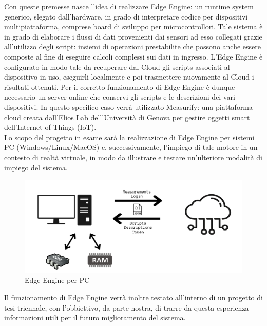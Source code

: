 Con queste premesse nasce l'idea di realizzare Edge Engine: un runtime system generico, slegato dall'hardware, in grado di interpretare codice per dispositivi multipiattaforma, comprese board di sviluppo per microcontrollori. Tale sistema è in grado di elaborare i flussi di dati provenienti dai sensori ad esso collegati grazie all'utilizzo degli script: insiemi di operazioni prestabilite che possono anche essere composte al fine di eseguire calcoli complessi sui dati in ingresso. L'Edge Engine è configurato in modo tale da recuperare dal Cloud gli scripts associati al dispositivo in uso, eseguirli localmente e poi trasmettere nuovamente al Cloud i risultati ottenuti. Per il corretto funzionamento di Edge Engine è dunque necessario un server online che conservi gli scripts e le descrizioni dei vari dispositivi. In questo specifico caso verrà utilizzato Measurify: una piattaforma cloud creata dall'Elios Lab dell'Università di Genova per gestire oggetti smart dell'Internet of Things (IoT).\\
Lo scopo del progetto in esame sarà la realizzazione di Edge Engine per sistemi PC (Windows/Linux/MacOS) e, successivamente, l'impiego di tale motore in un contesto di realtà virtuale, in modo da illustrare e testare un'ulteriore modalità di impiego del sistema.
\begin{figure}[H]
	\centering
	\includegraphics[width=\linewidth]{pics/edgine}
	\caption{Edge Engine per PC}
	\label{edgine}
\end{figure}
Il funzionamento di Edge Engine verrà inoltre testato all'interno di un progetto di tesi triennale, con l'obbiettivo, da parte nostra, di trarre da questa esperienza informazioni utili per il futuro miglioramento del sistema.